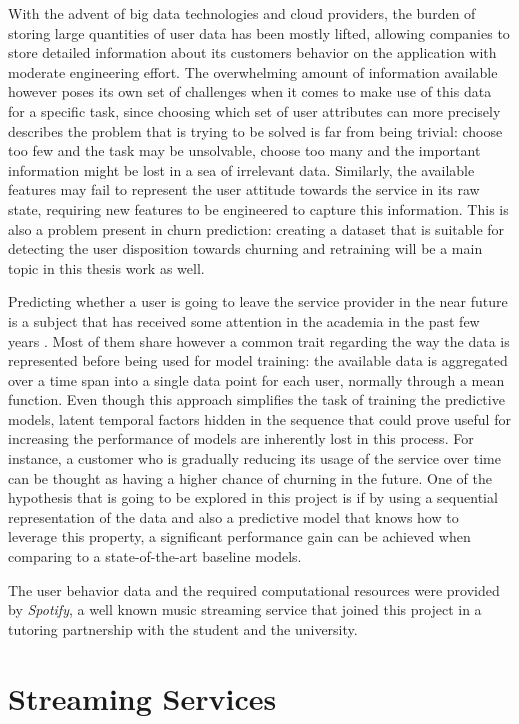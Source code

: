 \documentclass{kththesis}
\begin{document}
	With the advent of big data technologies and cloud providers, the burden of storing large quantities of user data has been mostly lifted, allowing companies to store detailed information about its customers behavior on the application with moderate engineering effort. The overwhelming amount of information available however poses its own set of challenges when it comes to make use of this data for a specific task, since choosing which set of user attributes can more precisely describes the problem that is trying to be solved is far from being trivial: choose too few and the task may be unsolvable, choose too many and the important information might be lost in a sea of irrelevant data. Similarly, the available features may fail to represent the user attitude towards the service in its raw state, requiring  new features to be engineered to capture this information. This is also a problem present in churn prediction: creating a dataset that is suitable for detecting the user disposition towards churning and retraining will be a main topic in this thesis work as well.
	
	Predicting whether a user is going to leave the service provider in the near future is a subject that has received some attention in the academia in the past few years \citep{Pudipeddi2014}\citep{GurAli2014}\citep{Drachen2016RapidPO}. Most of them share however a common trait regarding the way the data is represented before being used for model training: the available data is aggregated over a time span into a single data point for each user, normally through a mean function. Even though this approach simplifies the task of training the predictive models, latent temporal factors hidden in the sequence that could prove useful for increasing the performance of models are inherently lost in this process. For instance, a customer who is gradually reducing its usage of the service over time  can be thought as having a higher chance of churning in the future. One of the hypothesis that is going to be explored in this project is if by using a sequential representation of the data and also a predictive model that knows how to leverage this property, a significant performance gain can be achieved when comparing to a state-of-the-art baseline models. 
	 
	The user behavior data and the required computational resources were provided by \emph{Spotify}, a well known music streaming service that joined this project in a tutoring partnership with the student and the university. 
	
	
	\section{Streaming Services}
	
\end{document}
